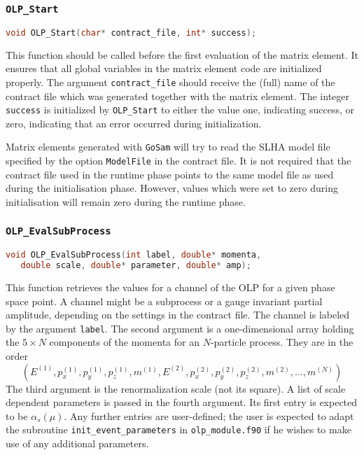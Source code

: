 \documentclass[11pt,a4paper]{refrep}
\newcommand{\golemversion}{{1{.}0}}
\newcommand{\golemv}[1][\golemversion]{{\tt GoSam}\xspace}
\begin{document}
\subsubsection*{\texttt{OLP\_Start}}
\begin{lstlisting}[language=C]
void OLP_Start(char* contract_file, int* success);
\end{lstlisting}
This function should be called before the first evaluation of the matrix
element. It ensures that all global variables in the matrix element code
are initialized properly. The argument \lstinline!contract_file!
should receive the (full) name of the contract file which was generated
together with the matrix element. The integer \lstinline!success! is
initialized by \lstinline!OLP_Start! to either the value one, indicating
success, or zero, indicating that an error occurred during initialization.

Matrix elements generated with \golemv{} will try to read the SLHA model
file specified by the option \lstset{language=olp}\lstinline!ModelFile!
in the contract file. It is not required that the contract file used in
the runtime phase points to the same model file as used during the
initialisation phase. However, values which were set to zero during
initialisation will remain zero during the runtime phase.

\subsubsection*{\texttt{OLP\_EvalSubProcess}}
\lstset{language=C}
\begin{lstlisting}[language=C]
void OLP_EvalSubProcess(int label, double* momenta,
   double scale, double* parameter, double* amp);
\end{lstlisting}
This function retrieves the values for a channel of the OLP for a given
phase space point. A channel might be a subprocess or a
gauge invariant partial amplitude, depending on the settings in the
contract file. The channel is labeled by the argument \lstinline!label!.
The second argument is a one-dimensional array holding the $5\times N$
components of the momenta for an $N$-particle process. They are in the order
\begin{displaymath}
(E^{(1)}, p_x^{(1)}, p_y^{(1)}, p_z^{(1)}, m^{(1)},
 E^{(2)}, p_x^{(2)}, p_y^{(2)}, p_z^{(2)}, m^{(2)},
 \ldots, m^{(N)})
\end{displaymath}
The third argument is the renormalization scale (not its square).
A list of scale dependent parameters is passed in the fourth argument.
Its first entry is expected to be $\alpha_s(\mu)$. Any further entries
are user-defined; the user is expected to adapt the subroutine
\texttt{init\_event\_parameters} in \texttt{olp\_module.f90}
if he wishes to make use of any additional parameters.
\end{document}
